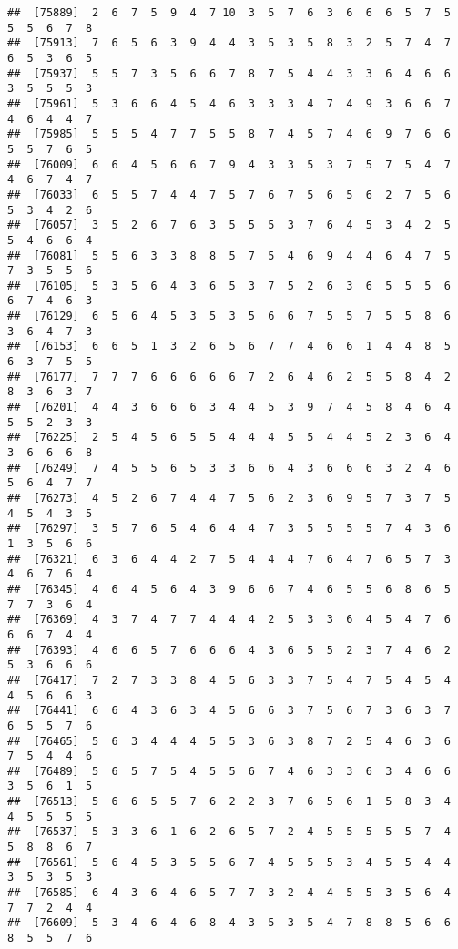 \documentclass[
]{book}
\begin{document}
\begin{verbatim}
##  [75889]  2  6  7  5  9  4  7 10  3  5  7  6  3  6  6  6  5  7  5  5  5  6  7  8
##  [75913]  7  6  5  6  3  9  4  4  3  5  3  5  8  3  2  5  7  4  7  6  5  3  6  5
##  [75937]  5  5  7  3  5  6  6  7  8  7  5  4  4  3  3  6  4  6  6  3  5  5  5  3
##  [75961]  5  3  6  6  4  5  4  6  3  3  3  4  7  4  9  3  6  6  7  4  6  4  4  7
##  [75985]  5  5  5  4  7  7  5  5  8  7  4  5  7  4  6  9  7  6  6  5  5  7  6  5
##  [76009]  6  6  4  5  6  6  7  9  4  3  3  5  3  7  5  7  5  4  7  4  6  7  4  7
##  [76033]  6  5  5  7  4  4  7  5  7  6  7  5  6  5  6  2  7  5  6  5  3  4  2  6
##  [76057]  3  5  2  6  7  6  3  5  5  5  3  7  6  4  5  3  4  2  5  5  4  6  6  4
##  [76081]  5  5  6  3  3  8  8  5  7  5  4  6  9  4  4  6  4  7  5  7  3  5  5  6
##  [76105]  5  3  5  6  4  3  6  5  3  7  5  2  6  3  6  5  5  5  6  6  7  4  6  3
##  [76129]  6  5  6  4  5  3  5  3  5  6  6  7  5  5  7  5  5  8  6  3  6  4  7  3
##  [76153]  6  6  5  1  3  2  6  5  6  7  7  4  6  6  1  4  4  8  5  6  3  7  5  5
##  [76177]  7  7  7  6  6  6  6  6  7  2  6  4  6  2  5  5  8  4  2  8  3  6  3  7
##  [76201]  4  4  3  6  6  6  3  4  4  5  3  9  7  4  5  8  4  6  4  5  5  2  3  3
##  [76225]  2  5  4  5  6  5  5  4  4  4  5  5  4  4  5  2  3  6  4  3  6  6  6  8
##  [76249]  7  4  5  5  6  5  3  3  6  6  4  3  6  6  6  3  2  4  6  5  6  4  7  7
##  [76273]  4  5  2  6  7  4  4  7  5  6  2  3  6  9  5  7  3  7  5  4  5  4  3  5
##  [76297]  3  5  7  6  5  4  6  4  4  7  3  5  5  5  5  7  4  3  6  1  3  5  6  6
##  [76321]  6  3  6  4  4  2  7  5  4  4  4  7  6  4  7  6  5  7  3  4  6  7  6  4
##  [76345]  4  6  4  5  6  4  3  9  6  6  7  4  6  5  5  6  8  6  5  7  7  3  6  4
##  [76369]  4  3  7  4  7  7  4  4  4  2  5  3  3  6  4  5  4  7  6  6  6  7  4  4
##  [76393]  4  6  6  5  7  6  6  6  4  3  6  5  5  2  3  7  4  6  2  5  3  6  6  6
##  [76417]  7  2  7  3  3  8  4  5  6  3  3  7  5  4  7  5  4  5  4  4  5  6  6  3
##  [76441]  6  6  4  3  6  3  4  5  6  6  3  7  5  6  7  3  6  3  7  6  5  5  7  6
##  [76465]  5  6  3  4  4  4  5  5  3  6  3  8  7  2  5  4  6  3  6  7  5  4  4  6
##  [76489]  5  6  5  7  5  4  5  5  6  7  4  6  3  3  6  3  4  6  6  3  5  6  1  5
##  [76513]  5  6  6  5  5  7  6  2  2  3  7  6  5  6  1  5  8  3  4  4  5  5  5  5
##  [76537]  5  3  3  6  1  6  2  6  5  7  2  4  5  5  5  5  5  7  4  5  8  8  6  7
##  [76561]  5  6  4  5  3  5  5  6  7  4  5  5  5  3  4  5  5  4  4  3  5  3  5  3
##  [76585]  6  4  3  6  4  6  5  7  7  3  2  4  4  5  5  3  5  6  4  7  7  2  4  4
##  [76609]  5  3  4  6  4  6  8  4  3  5  3  5  4  7  8  8  5  6  6  8  5  5  7  6

\end{verbatim}
\end{document}
